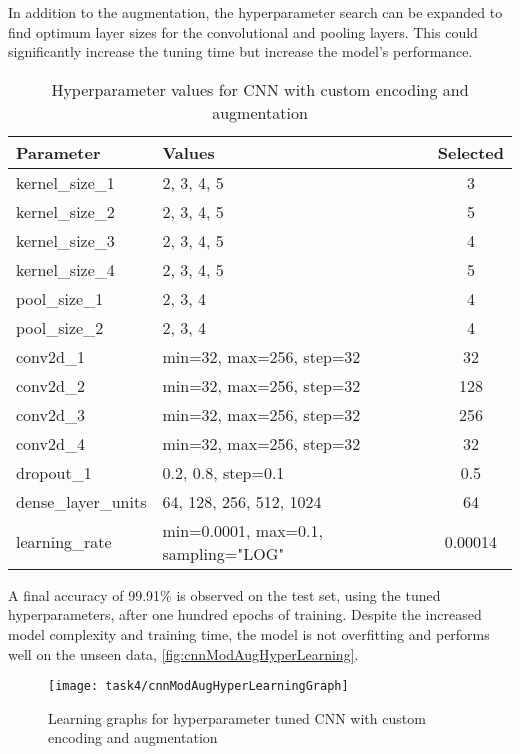 \pagebreak
In addition to the augmentation, the hyperparameter search can be expanded to find optimum layer sizes for the convolutional and pooling layers. This could significantly increase the tuning time but increase the model's performance.

\bgroup
    \begin{table}[!htbp]
        \centering
        \begin{tabular}{ll|c}
            \hline
            Parameter & Values & Selected \\ \hline
            kernel\_size\_1 & 2, 3, 4, 5 & 3 \\
            kernel\_size\_2 & 2, 3, 4, 5 & 5 \\
            kernel\_size\_3 & 2, 3, 4, 5 & 4 \\
            kernel\_size\_4 & 2, 3, 4, 5 & 5 \\
            pool\_size\_1 & 2, 3, 4 & 4 \\
            pool\_size\_2 & 2, 3, 4 & 4 \\
            conv2d\_1 & min=32, max=256, step=32 & 32 \\
            conv2d\_2 & min=32, max=256, step=32 & 128 \\
            conv2d\_3 & min=32, max=256, step=32 & 256 \\
            conv2d\_4 & min=32, max=256, step=32 & 32 \\
            dropout\_1 & 0.2, 0.8, step=0.1 & 0.5 \\
            dense\_layer\_units & 64, 128, 256, 512, 1024 & 64 \\
            learning\_rate & min=0.0001, max=0.1, sampling="LOG" & 0.00014 \\
        \end{tabular}
        \caption{Hyperparameter values for CNN with custom encoding and augmentation}
        \label{tbl:hyperCNNModAug}
    \end{table}
\egroup

A final accuracy of 99.91\% is observed on the test set, using the tuned hyperparameters, after one hundred epochs of training. Despite the increased model complexity and training time, the model is not overfitting and performs well on the unseen data, \autoref{fig:cnnModAugHyperLearning}.

\begin{figure}[!htbp]
    \centering
    \texttt{[image: task4/cnnModAugHyperLearningGraph]}
    \caption[Learning graphs for hyperparameter tuned CNN with custom encoding and augmentation]
    {Learning graphs for hyperparameter tuned CNN with custom encoding and augmentation}
    \label{fig:cnnModAugHyperLearning}
\end{figure}

